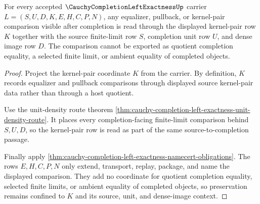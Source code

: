 \begin{theorem}
\label{thm:cauchy-completion-left-exactness-kernel-pair-preservation}
For every accepted $\CauchyCompletionLeftExactnessUp$ carrier $L=(S,U,D,K,E,H,C,P,N)$, any equalizer, pullback, or kernel-pair comparison visible after completion is read through the displayed kernel-pair row $K$ together with the source finite-limit row $S$, completion unit row $U$, and dense image row $D$. The comparison cannot be exported as quotient completion equality, a selected finite limit, or ambient equality of completed objects.
\end{theorem}
\begin{proof}
Project the kernel-pair coordinate $K$ from the carrier. By definition, $K$ records equalizer and pullback comparisons through displayed source kernel-pair data rather than through a host quotient.

Use the unit-density route theorem \autoref{thm:cauchy-completion-left-exactness-unit-density-route}. It places every completion-facing finite-limit comparison behind $S,U,D$, so the kernel-pair row is read as part of the same source-to-completion passage.

Finally apply \autoref{thm:cauchy-completion-left-exactness-namecert-obligations}. The rows $E,H,C,P,N$ only extend, transport, replay, package, and name the displayed comparison. They add no coordinate for quotient completion equality, selected finite limits, or ambient equality of completed objects, so preservation remains confined to $K$ and its source, unit, and dense-image context.
\end{proof}

